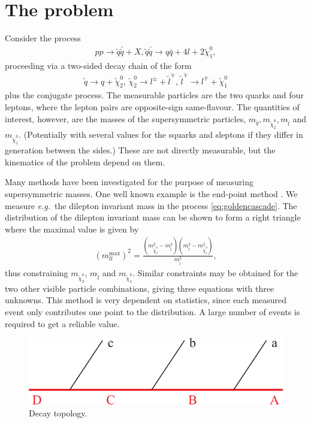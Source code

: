 \documentclass[twoside,english]{uiofysmaster}
\begin{document}
\section{The problem}
Consider the process
\begin{align}
	pp \to \tilde{q}\bar{\tilde{q}} + X, \tilde{q}\bar{\tilde{q}} \to q\bar{q} + 4l + 2\tilde{\chi}_1^0,
\end{align}
proceeding via a two-sided decay chain of the form
\begin{align}
	\tilde{q} \to q + \tilde{\chi}_2^0, \, \tilde{\chi}_2^0 \to l^{\pm} + \tilde{l}^\mp, \, \tilde{l}^\mp \to l^\mp + \tilde{\chi}_1^0\label{eq:goldencascade}
\end{align}
plus the conjugate process. The measurable particles are the two quarks and four leptons, where the lepton pairs are opposite-sign same-flavour. The quantities of interest, however, are the masses of the supersymmetric particles, $m_{\tilde{q}}, m_{\tilde{\chi}_2^0}, m_{\tilde{l}}$ and $m_{\tilde{\chi}_1^0}$. (Potentially with several values for the squarks and sleptons if they differ in generation between the sides.) These are not directly measurable, but the kinematics of the problem depend on them. 

Many methods have been investigated for the purpose of measuring supersymmetric masses. One well known example is the end-point method \cite{1126-6708-2000-09-004}. We measure {\it e.g.}\ the dilepton invariant mass in the process \eqref{eq:goldencascade}. The distribution of the dilepton invariant mass can be shown to form a right triangle where the maximal value is given by
\begin{align}
	(m_{ll}^\mathrm{max})^2 = \frac{ \left( m^2_{\tilde{\chi}_2^0} - m^2_{\tilde{l}} \right) \left( m^2_{\tilde{l}} - m^2_{\tilde{\chi}_1^0} \right)}{m^2_{\tilde{l}}}, \label{eq:invariant_mass_endpoint}
\end{align}
thus constraining $m_{\tilde{\chi}_2^0}$, $m_{\tilde{l}}$ and $m_{\tilde{\chi}_1^0}$. Similar constraints may be obtained for the two other visible particle combinations, giving three equations with three unknowns. This method is very dependent on statistics, since each measured event only contributes one point to the distribution. A large number of events is required to get a reliable value.

\begin{figure}[hbt]
\centering
\includegraphics[scale=0.7]{figures/fig-chain.pdf} %
\caption{Decay topology.}
\label{fig:decaytree}
\end{figure}
\end{document}
